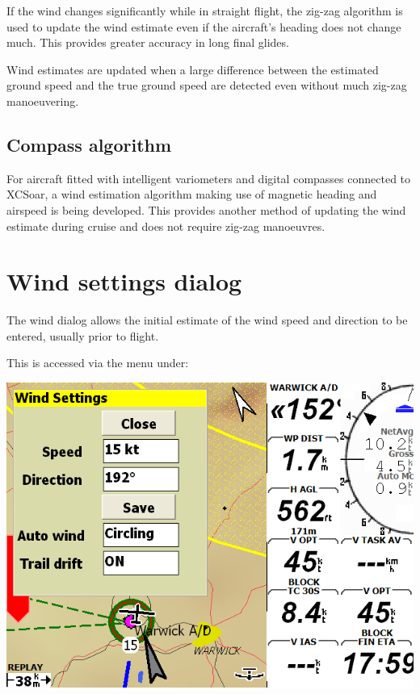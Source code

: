\documentclass[a4paper,12pt]{refrep}
\begin{document}
If the wind changes significantly while in straight flight, the
zig-zag algorithm is used to update the wind estimate even if the
aircraft's heading does not change much. This provides greater
accuracy in long final glides.

Wind estimates are updated when a large difference between the
estimated ground speed and the true ground speed are detected even
without much zig-zag manoeuvering.

\subsection*{Compass algorithm}

For aircraft fitted with intelligent variometers and digital compasses
connected to XCSoar, a wind estimation algorithm making use of
magnetic heading and airspeed is being developed.  This provides
another method of updating the wind estimate during cruise and does
not require zig-zag manoeuvres.

\section{Wind settings dialog}

The wind dialog allows the initial estimate of the wind speed and
direction to be entered, usually prior to flight.

This is accessed via the menu under:
\begin{quote}
\blink{}
\end{quote}

\begin{center}
\includegraphics[angle=0,width=\linewidth,keepaspectratio='true']{figures/dialog-wind2.png}
\end{center}
\end{document}
